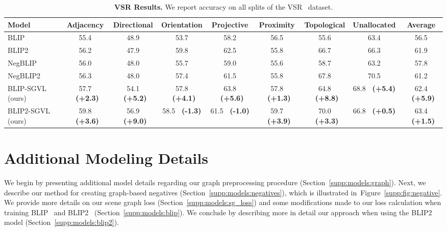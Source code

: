\documentclass[11pt]{article}
\def\Secref#1{Section~\ref{#1}}
\newcommand{\figgref}[1]{Figure~\ref{#1}}
\newcommand{\tablestyle}[2]{\setlength{\tabcolsep}{#1}\renewcommand{\arraystretch}{#2}\centering\footnotesize}
\newcommand{\gcol}[1]{{\bf \fontsize{6.5}{42}\selectfont \color{citecolor!80}~(#1)}}
\newcommand{\rcol}[1]{{\bf \fontsize{6.5}{42}\selectfont \color{lightred!180}~(#1)}}
\def\Secref#1{Section~\ref{#1}}
\begin{document}
\begin{table*}[t!]
\label{supp:tab:res_vlc_full}
\end{table*} \begin{table*}[t!]
\centering
	\tablestyle{2.7pt}{1.}
	\scriptsize
    \begin{small}
    \begin{tabular}{l|cccccccc}
            \toprule
            Model & Adjacency & Directional & Orientation & Projective & Proximity & Topological & Unallocated & Average\\
            \midrule
            BLIP  & 55.4 & 48.9 & 53.7 & 58.2 & 56.5 & 55.6 & 63.4 & 56.5\\
            BLIP2  &56.2  &47.9  &59.8  &62.5  &55.8  &66.7  &66.3  &61.9 \\
            \midrule
            NegBLIP &56.0  &48.0  &55.7  &59.0 & 55.6 &58.7 & 63.2 & 57.8 \\
            NegBLIP2 &56.3  &48.0  &57.4  &61.5 &55.8 &67.8&70.5& 61.2 \\
            \midrule
            BLIP-SGVL (ours) & 57.7 \gcol{+2.3} & 54.1 \gcol{+5.2} & 57.8 \gcol{+4.1} & 63.8 \gcol{+5.6}& 57.8 \gcol{+1.3}& 64.8 \gcol{+8.8} & 68.8 \gcol{+5.4} & 62.4 \gcol{+5.9}\\

            BLIP2-SGVL (ours) & 59.8 \gcol{+3.6}  & 56.9 \gcol{+9.0} & 58.5 \rcol{-1.3} & 61.5 \rcol{-1.0} & 59.7 \gcol{+3.9} &  70.0 \gcol{+3.3} & 66.8 \gcol{+0.5} & 63.4 \gcol{+1.5}\\
            \bottomrule
    \end{tabular}
    \end{small}
    \vspace{-1.0em}
    \caption{
    \textbf{VSR Results.} We report accuracy on all splits of the VSR~\cite{Liu2022VisualSR} dataset.}
    \vspace{-1.5em}
\label{supp:tab:res_vsr_neg}
\end{table*} 














\section{Additional Modeling Details}
\label{supp:method}
We begin by presenting additional model details regarding our graph preprocessing procedure (\Secref{supp:models:graph}). Next, we describe our method for creating graph-based negatives (\Secref{supp:models:negatives}), which is illustrated in~\figgref{supp:fig:negative}. We provide more details on our scene graph loss (\Secref{supp:models:sg_loss}) and some modifications made to our loss calculation when training BLIP~\cite{blip} and BLIP2~\cite{li2023blip2} (\Secref{supp:models:blip}). We conclude by describing more in detail our approach when using the BLIP2 model (\Secref{supp:models:blip2}).
\end{document}
